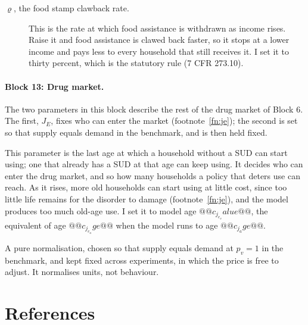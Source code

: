 \documentclass[10pt]{article}
\begin{document}
\begin{description}
\item[$\varrho$, the food stamp clawback rate.] This is the rate at which food assistance is withdrawn as income rises. Raise it and food assistance is clawed back faster, so it stops at a lower income and pays less to every household that still receives it. I set it to thirty percent, which is the statutory rule (7 CFR 273.10).
\end{description}

\paragraph{Block 13: Drug market.} The two parameters in this block describe the rest of the drug
market of Block 6. The first, $J_E$, fixes who can enter the market (footnote~\ref{fn:je}); the second is set so that supply equals demand in the benchmark, and is
then held fixed.
\begin{description}\setlength{\itemsep}{0.25em}\setlength{\parskip}{0em}

\item[$J_E$, the last age at which use can begin.] This parameter is the last age at which a household without a SUD can start using; one that already has a SUD at that age can keep using. It decides who can enter the drug market, and so how many households a policy that deters use can reach. As it rises, more old households can start using at little cost, since too little life remains for the disorder to damage (footnote~\ref{fn:je}), and the model produces too much old-age use. I set it to model age $@@c_j_e_value@@$, the equivalent of age $@@c_j_e_age@@$ when the model runs to age $@@c_j_age@@$.

\item[$\nu_1$, the supply shifter.] A pure normalisation, chosen so that supply
equals demand at $p_v=1$ in the benchmark, and kept fixed across experiments, in which the price is free to adjust. It normalises units, not behaviour.

\end{description}

\clearpage


\section*{References}
\end{document}
